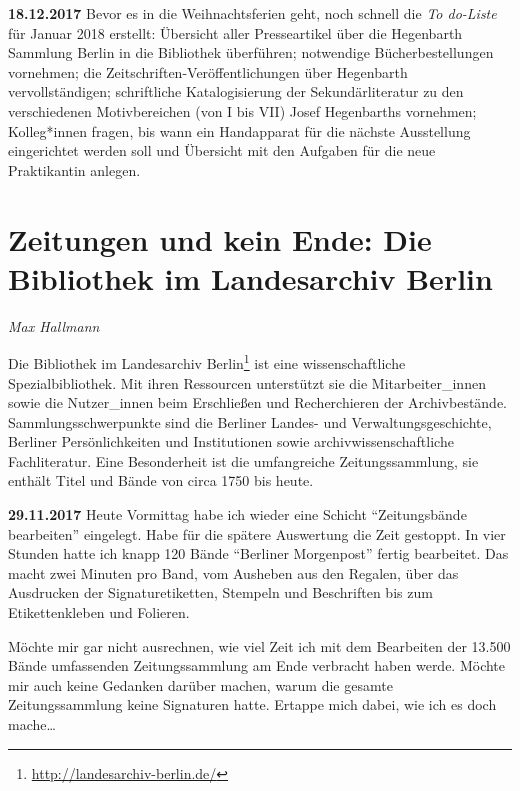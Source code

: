 \documentclass[a4paper,
fontsize=11pt,
oneside,
numbers=noperiodatend,
parskip=half-,
bibliography=totoc,
final
]{scrartcl}
\begin{document}
\textbf{18.12.2017} Bevor es in die Weihnachtsferien geht, noch schnell
die \emph{To do-Liste} für Januar 2018 erstellt: Übersicht aller
Presseartikel über die Hegenbarth Sammlung Berlin in die Bibliothek
überführen; notwendige Bücherbestellungen vornehmen; die
Zeitschriften-Veröffentlichungen über Hegenbarth vervollständigen;
schriftliche Katalogisierung der Sekundärliteratur zu den verschiedenen
Motivbereichen (von I bis VII) Josef Hegenbarths vornehmen; Kolleg*innen
fragen, bis wann ein Handapparat für die nächste Ausstellung
eingerichtet werden soll und Übersicht mit den Aufgaben für die neue
Praktikantin anlegen.

\hypertarget{zeitungen-und-kein-ende-die-bibliothek-im-landesarchiv-berlin}{%
\section{Zeitungen und kein Ende: Die Bibliothek im Landesarchiv
Berlin}\label{zeitungen-und-kein-ende-die-bibliothek-im-landesarchiv-berlin}}

\emph{Max Hallmann}

Die Bibliothek im Landesarchiv Berlin\footnote{\url{http://landesarchiv-berlin.de/}}
ist eine wissenschaftliche Spezialbibliothek. Mit ihren Ressourcen
unterstützt sie die Mitarbeiter\_innen sowie die Nutzer\_innen beim
Erschließen und Recherchieren der Archivbestände. Sammlungsschwerpunkte
sind die Berliner Landes- und Verwaltungsgeschichte, Berliner
Persönlichkeiten und Institutionen sowie archivwissenschaftliche
Fachliteratur. Eine Besonderheit ist die umfangreiche Zeitungssammlung,
sie enthält Titel und Bände von circa 1750 bis heute.

\textbf{29.11.2017} Heute Vormittag habe ich wieder eine Schicht
\enquote{Zeitungsbände bearbeiten} eingelegt. Habe für die spätere
Auswertung die Zeit gestoppt. In vier Stunden hatte ich knapp 120 Bände
\enquote{Berliner Morgenpost} fertig bearbeitet. Das macht zwei Minuten
pro Band, vom Ausheben aus den Regalen, über das Ausdrucken der
Signaturetiketten, Stempeln und Beschriften bis zum Etikettenkleben und
Folieren.

Möchte mir gar nicht ausrechnen, wie viel Zeit ich mit dem Bearbeiten
der 13.500 Bände umfassenden Zeitungssammlung am Ende verbracht haben
werde. Möchte mir auch keine Gedanken darüber machen, warum die gesamte
Zeitungssammlung keine Signaturen hatte. Ertappe mich dabei, wie ich es
doch mache\ldots{}
\end{document}
